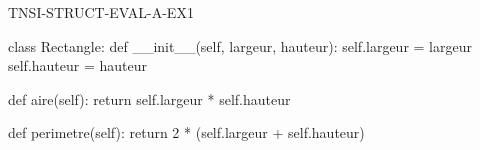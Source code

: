\begin{corrige}{TNSI-STRUCT-EVAL-A-EX1}
\begin{python}
class Rectangle:
    def __init__(self, largeur, hauteur):
        self.largeur = largeur
        self.hauteur = hauteur

    def aire(self):
        return self.largeur * self.hauteur

    def perimetre(self):
        return 2 * (self.largeur + self.hauteur)
\end{python}
\end{corrige}

